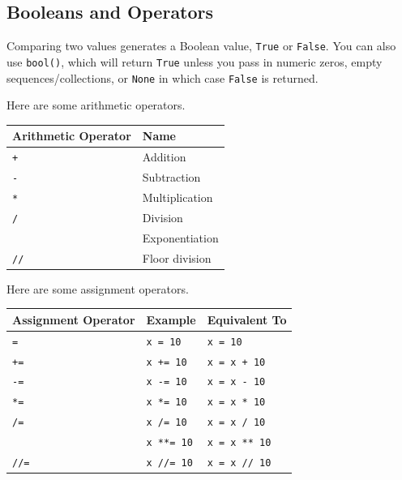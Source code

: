 \documentclass[11pt]{scrartcl}
\theoremstyle{definition}
\begin{document}
\subsection{Booleans and Operators}

Comparing two values generates a Boolean value, \texttt{True} or \texttt{False}. You can
also use \texttt{bool()}, which will return \texttt{True} unless you pass in numeric zeros, 
empty sequences/collections, or \texttt{None} in which case \texttt{False} is returned.

Here are some arithmetic operators.

\begin{center}
\begin{tabular}{|l|l|} \hline
    \textbf{Arithmetic Operator} & \textbf{Name} \\ \hline
    \texttt{+} & Addition \\ \hline
    \texttt{-} & Subtraction \\ \hline
    \texttt{*} & Multiplication \\ \hline
    \texttt{/} & Division \\ \hline
    \texttt{%
    \texttt{**} & Exponentiation \\ \hline
    \texttt{//} & Floor division \\ \hline
\end{tabular}
\end{center}

Here are some assignment operators.

\begin{center}
\begin{tabular}{|l|l|l|} \hline
    \textbf{Assignment Operator} & \textbf{Example} & \textbf{Equivalent To} \\ \hline
    \texttt{=} & \texttt{x = 10} & \texttt{x = 10} \\ \hline
    \texttt{+=} & \texttt{x += 10} & \texttt{x = x + 10} \\ \hline
    \texttt{-=} & \texttt{x -= 10} & \texttt{x = x - 10} \\ \hline
    \texttt{*=} & \texttt{x *= 10} & \texttt{x = x * 10} \\ \hline
    \texttt{/=} & \texttt{x /= 10} & \texttt{x = x / 10} \\ \hline
    \texttt{%
    \texttt{**=} & \texttt{x **= 10} & \texttt{x = x ** 10} \\ \hline
    \texttt{//=} & \texttt{x //= 10} & \texttt{x = x // 10} \\ \hline
\end{tabular}
\end{center}
\end{document}
